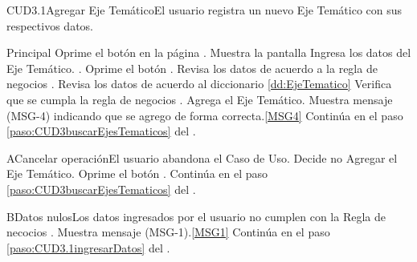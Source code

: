 	\begin{UseCase}{CUD3.1}{Agregar Eje Temático}{El usuario registra un nuevo Eje Temático con sus respectivos datos.}
	\end{UseCase}
	\begin{UCtrayectoria}{Principal}
			\UCpaso[\UCactor] Oprime el botón  en la página .
			\UCpaso Muestra la pantalla  
			\UCpaso [\UCactor] Ingresa los datos del Eje Temático.  \label{paso:CUD3.1ingresarDatos}.
			\UCpaso [\UCactor] Oprime el botón .
			\UCpaso Revisa los datos de acuerdo a la regla de negocios . 
			\UCpaso Revisa los datos de acuerdo al diccionario \ref{dd:EjeTematico} 
			\UCpaso Verifica que se cumpla la regla de negocios .  
			\UCpaso Agrega el Eje Temático.
			\UCpaso Muestra mensaje (MSG-4) indicando que se agrego de forma correcta.\ref{MSG4}
			\UCpaso Continúa en el paso \ref{paso:CUD3buscarEjesTematicos} del .
	\end{UCtrayectoria}
	\newpage
	\begin{UCtrayectoriaA}{A}{Cancelar operación}{El usuario abandona el Caso de Uso.}
			\UCpaso[\UCactor] Decide no Agregar el Eje Temático.
			\UCpaso[\UCactor] Oprime el botón .
			\UCpaso Continúa en el paso \ref{paso:CUD3buscarEjesTematicos} del .
	\end{UCtrayectoriaA}
		
	\begin{UCtrayectoriaA}{B}{Datos nulos}{Los datos ingresados por el usuario  no cumplen con la Regla de necocios .}
			\UCpaso Muestra mensaje (MSG-1).\ref{MSG1}
			\UCpaso Continúa en el paso \ref{paso:CUD3.1ingresarDatos} del .
	\end{UCtrayectoriaA}

